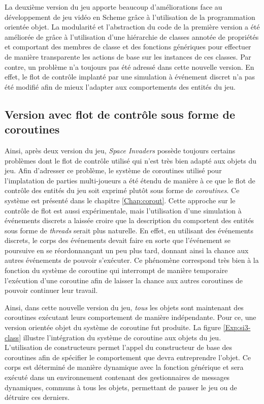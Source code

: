 \documentclass[12pt,oneside,letterpaper,francais]{book}
\newcommand{\si}{{\textit{Space Invaders }}}
\newcommand{\scheme}[1]{\selectlanguage{english}{\tt #1}\selectlanguage{french}}
\begin{document}
La deuxième version du jeu apporte beaucoup d'améliorations face au
développement de jeu vidéo en Scheme grâce à l'utilisation de la
programmation orientée objet. La modularité et l'abstraction du code
de la première version a été améliorée de grâce à l'utilisation d'une
hiérarchie de classes annotée de propriétés et comportant des membres
de classe et des fonctions génériques pour effectuer de manière
transparente les actions de base sur les instances de ces classes. Par
contre, un problème n'a toujours pas été adressé dans cette nouvelle
version. En effet, le flot de contrôle implanté par une simulation à
événement discret n'a pas été modifié afin de mieux l'adapter aux
comportements des entités du jeu.


\subsection{Version avec flot de contrôle sous forme de coroutines}
\label{Exp:sp3}

Ainsi, après deux version du jeu, \si possède toujours certains
problèmes dont le flot de contrôle utilisé qui n'est très bien adapté
aux objets du jeu. Afin d'adresser ce problème, le système de
coroutines utilisé pour l'implatation de parties multi-joueurs a été
étendu de manière à ce que le flot de contrôle des entités du jeu soit
exprimé plutôt sous forme de \emph{coroutines}. Ce système est
présenté dans le chapitre \ref{Chap:corout}. Cette approche sur le
contrôle de flot est aussi expérimentale, mais l'utilisation d'une
simulation à événements discrets a laissée croire que la description
du comportent des entités sous forme de \textit{threads} serait plus
naturelle. En effet, en utilisant des événements discrets, le corps
des événements devait faire en sorte que l'événement se poursuive en
se réordonnançant un peu plus tard, donnant ainsi la chance aux autres
événements de pouvoir s'exécuter. Ce phénomène correspond très bien à
la fonction \scheme{yield} du système de coroutine qui interrompt de
manière temporaire l'exécution d'une coroutine afin de laisser la
chance aux autres coroutines de pouvoir continuer leur travail.

Ainsi, dans cette nouvelle version du jeu, \emph{tous} les objets sont
maintenant des coroutines exécutant leurs comportement de manière
indépendante. Pour ce, une version orientée objet du système de
coroutine fut produite. La figure \ref{Exp:si3-class} illustre
l'intégration du système de coroutine aux objets du jeu. L'utilisation
de constructeurs permet l'appel du constructeur de base des coroutines
afin de spécifier le comportement que devra entreprendre l'objet. Ce
corps est déterminé de manière dynamique avec la fonction générique
\scheme{behaviour} et sera exécuté dans un environnement contenant des
gestionnaires de messages dynamiques, communs à tous les objets,
permettant de pauser le jeu ou de détruire ces derniers.
\end{document}
